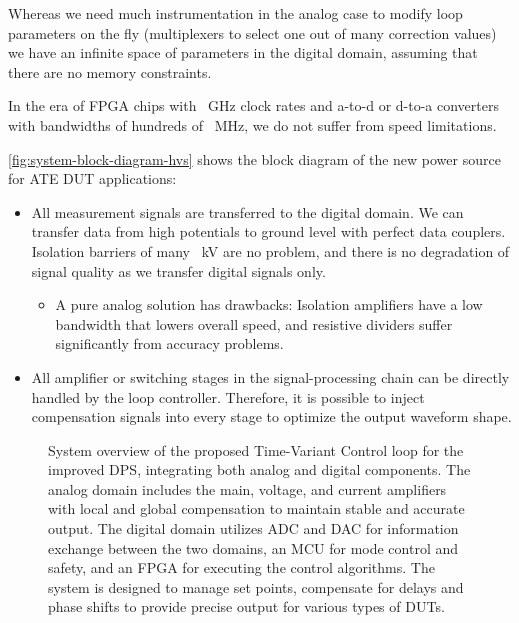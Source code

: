 Whereas we need much instrumentation in the analog case to modify
loop parameters on the fly (multiplexers to select one out of many correction
values) we have an infinite space of parameters in the digital domain,
assuming that there are no memory constraints.

In the era of \ac{FPGA} chips with \SI{}{\giga\hertz} clock rates and
a-to-d or d-to-a converters with bandwidths of hundreds of \SI{}{\mega\hertz},
we do not suffer from speed limitations.

\autoref{fig:system-block-diagram-hvs} shows the block diagram of the new power
source for \ac{ATE} \ac{DUT} applications:

\begin{itemize}[topsep=8pt,itemsep=4pt,partopsep=4pt, parsep=4pt]
    \item
    All measurement signals are transferred to the digital domain.
    We can transfer data from high potentials to ground level with perfect
    data couplers.
    Isolation barriers of many \SI{}{\kilo\volt} are no problem, and there is no
    degradation of signal quality as we transfer digital signals only.
    \begin{itemize}
        \item
        A pure analog solution has drawbacks: Isolation amplifiers have a
        low bandwidth that lowers overall speed, and resistive dividers suffer
        significantly from accuracy problems.
    \end{itemize}

    \item
    All amplifier or switching stages in the signal-processing chain can be
    directly handled by the loop controller.
    Therefore, it is possible to
    inject compensation signals into every stage to optimize the
    output waveform shape.

\end{itemize}

\begin{figure}[p]
    \centering
    \caption[System Overview of Time-Variant Control Loop]{
        System overview of the proposed Time-Variant Control loop for the
        improved \ac{DPS}, integrating both analog and digital components.
        The analog domain includes the main, voltage, and current amplifiers
        with local and global compensation to maintain stable and accurate
        output.
        The digital domain utilizes \ac{ADC} and \ac{DAC} for information
        exchange between the two domains, an \ac{MCU} for
        mode control and safety, and an FPGA for executing the control
        algorithms.
        The system is designed to manage set points, compensate for delays
        and phase shifts to provide precise output for various types
        of \acp{DUT}.
    }
    \label{fig:system-block-diagram-hvs}
\end{figure}

